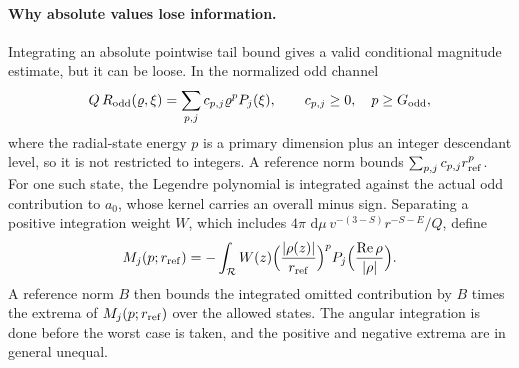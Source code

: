 \documentclass[11pt,a4paper]{article}
\numberwithin{equation}{section}
\newcommand{\dd}{\,\mathrm d}
\begin{document}
\paragraph{Why absolute values lose information.} Integrating an absolute pointwise tail bound gives a valid
conditional magnitude estimate, but it can be loose. In the normalized odd channel
\begin{equation}
 Q\,R_{\rm odd}(\varrho,\xi)=\sum_{p,j}c_{p,j}\varrho^pP_j(\xi),\qquad c_{p,j}\ge0,\quad p\ge G_{\rm odd},
 \label{eq:cone:states}
\end{equation}
where the radial-state energy $p$ is a primary dimension plus an integer descendant level, so it is not restricted to
integers. A reference norm bounds $\sum_{p,j}c_{p,j}r_{\rm ref}^p$. For one such state, the Legendre polynomial is
integrated against the actual odd contribution to $a_0$, whose kernel carries an overall minus sign. Separating a
positive integration weight $W$, which includes $4\pi\,\dd\mu\,v^{-(3-S)}r^{-S-E}/Q$, define
\begin{equation}
 M_j(p;r_{\rm ref})=-\int_{\mathcal R}W(z)\Bigl(\frac{|\rho(z)|}{r_{\rm ref}}\Bigr)^pP_j\Bigl(\frac{\operatorname{Re}\rho}{|\rho|}\Bigr).
\end{equation}
A reference norm $B$ then bounds the integrated omitted contribution by $B$ times the extrema of
$M_j(p;r_{\rm ref})$ over the allowed states. The angular integration is done before the worst case is taken, and the
positive and negative extrema are in general unequal.
\end{document}
